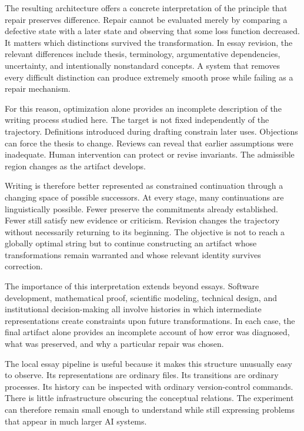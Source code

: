 \documentclass[11pt]{article}
\begin{document}
The resulting architecture offers a concrete interpretation of the principle that repair preserves difference. Repair cannot be evaluated merely by comparing a defective state with a later state and observing that some loss function decreased. It matters which distinctions survived the transformation. In essay revision, the relevant differences include thesis, terminology, argumentative dependencies, uncertainty, and intentionally nonstandard concepts. A system that removes every difficult distinction can produce extremely smooth prose while failing as a repair mechanism.

For this reason, optimization alone provides an incomplete description of the writing process studied here. The target is not fixed independently of the trajectory. Definitions introduced during drafting constrain later uses. Objections can force the thesis to change. Reviews can reveal that earlier assumptions were inadequate. Human intervention can protect or revise invariants. The admissible region changes as the artifact develops.

Writing is therefore better represented as constrained continuation through a changing space of possible successors. At every stage, many continuations are linguistically possible. Fewer preserve the commitments already established. Fewer still satisfy new evidence or criticism. Revision changes the trajectory without necessarily returning to its beginning. The objective is not to reach a globally optimal string but to continue constructing an artifact whose transformations remain warranted and whose relevant identity survives correction.

The importance of this interpretation extends beyond essays. Software development, mathematical proof, scientific modeling, technical design, and institutional decision-making all involve histories in which intermediate representations create constraints upon future transformations. In each case, the final artifact alone provides an incomplete account of how error was diagnosed, what was preserved, and why a particular repair was chosen.

The local essay pipeline is useful because it makes this structure unusually easy to observe. Its representations are ordinary files. Its transitions are ordinary processes. Its history can be inspected with ordinary version-control commands. There is little infrastructure obscuring the conceptual relations. The experiment can therefore remain small enough to understand while still expressing problems that appear in much larger AI systems.
\end{document}

